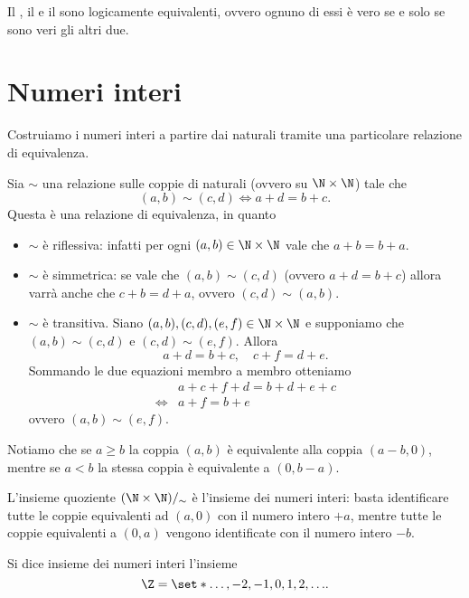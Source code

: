 \begin{remark}
    Il , il  e il  sono logicamente equivalenti, ovvero ognuno di essi è vero se e solo se sono veri gli altri due.
\end{remark}

\section{Numeri interi}

Costruiamo i numeri interi a partire dai naturali tramite una particolare relazione di equivalenza.

Sia $\sim$ una relazione sulle coppie di naturali (ovvero su $\N \times \N$) tale che \[
    (a, b) \sim (c, d) \iff a + d = b + c.
\]
Questa è una relazione di equivalenza, in quanto \begin{itemize}
    \item $\sim$ è riflessiva: infatti per ogni $(a, b) \in \N \times \N$ vale che $a + b = b + a$.
    \item $\sim$ è simmetrica: se vale che $(a, b) \sim (c, d)$ (ovvero $a + d = b + c$) allora varrà anche che $c + b = d + a$, ovvero $(c, d) \sim (a, b)$.
    \item $\sim$ è transitiva. Siano $(a, b), (c, d), (e, f) \in \N \times \N$ e supponiamo che $(a, b) \sim (c, d)$ e $(c, d) \sim (e, f)$. Allora \[
        a + d = b + c, \quad c + f = d + e.    
    \] Sommando le due equazioni membro a membro otteniamo \begin{align*}
        &a + c + f + d = b + d + e + c \\
        \iff &a + f = b + e  
    \end{align*} ovvero $(a, b) \sim (e, f)$.
\end{itemize}

Notiamo che se $a \geq b$ la coppia $(a, b)$ è equivalente alla coppia $(a-b, 0)$, mentre se $a < b$ la stessa coppia è equivalente a $(0, b-a)$.

L'insieme quoziente $(\N \times \N)/_{\sim}$ è l'insieme dei numeri interi: basta identificare tutte le coppie equivalenti ad $(a, 0)$ con il numero intero $+a$, mentre tutte le coppie equivalenti a $(0, a)$ vengono identificate con il numero intero $-b$.

\begin{definition}
    Si dice insieme dei numeri interi l'insieme \[
        \Z = \set*{\dots, -2, -1, 0, 1, 2, \dots}.    
    \]
\end{definition}

